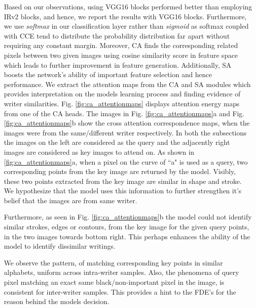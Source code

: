 \documentclass[a4paper,conference]{IEEEtran}
\begin{document}
Based on our observations, using VGG16 blocks performed better than employing IRv2 blocks, and hence, we report the results with VGG16 blocks.
Furthermore, we use \textit{softmax} in our classification layer rather than \textit{sigmoid} as softmax coupled with CCE tend to distribute the probability distribution far apart without requiring any constant margin.  Moreover, CA finds the corresponding related pixels between two given images using cosine similarity score in feature space which leads to further improvement in feature generation. Additionally, SA boosts the network's ability of important feature selection and hence performance.
\newline \indent We extract the attention maps from the CA and SA modules which provides interpretation on the models learning process and finding evidence of writer similarities. Fig. \ref{fig:ca_attentionmaps} displays attention energy maps from one of the CA heads. The images in Fig. \ref{fig:ca_attentionmaps}a and Fig. \ref{fig:ca_attentionmaps}b show the cross attention correspondence maps, when the images were from the same/different writer respectively. In both the subsections the images on the left are considered as the query and the adjacently right images are considered as key images to attend on. As shown in \ref{fig:ca_attentionmaps}a, when a pixel on the curve of ``a" is used as a query, two corresponding points from the key image are returned by the model. Visibly, these two points extracted from the key image are similar in shape and stroke. We hypothesize that the model uses this information to further strengthen it's belief that the images are from same writer. 

Furthermore, as seen in Fig. \ref{fig:ca_attentionmaps}b the model could not identify similar strokes, edges or contours, from the key image for the given query points, in the two images towards bottom right. This perhaps enhances the ability of the model to identify dissimilar writings. 

We observe the pattern, of matching corresponding key points in similar alphabets, uniform across intra-writer samples. Also, the phenomena of query pixel matching an exact same black/non-important pixel in the image, is consistent for inter-writer samples. This provides a hint to the FDE's for the reason behind the models decision.
\end{document}
